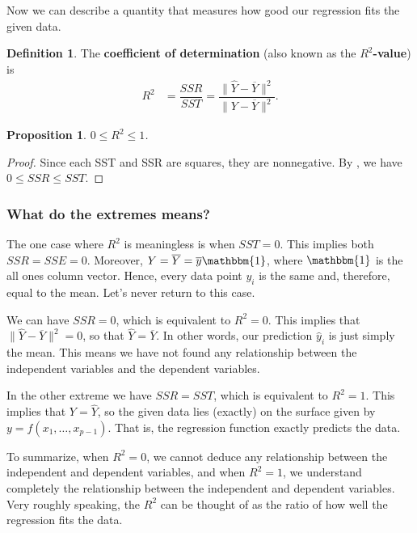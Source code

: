 \documentclass[a4paper, 12pt]{article}
\numberwithin{equation}{section}
\numberwithin{figure}{section}
\newtheorem{prop}[thm]{Proposition}
\theoremstyle{definition}
\newtheorem{defn}[thm]{Definition}
\renewcommand{\leq}{\leqslant}
\begin{document}
Now we can describe a quantity that measures how good our regression fits the
given data. 

\begin{defn}
	The \textbf{coefficient of determination} (also known as the
	\textbf{$R^2$-value}) is 
	\begin{align*} 
		R^2 &= \dfrac{SSR}{SST} = \dfrac{\|\widehat{Y} - \overline{Y}\|^2}{\| Y - \overline{Y}\|^2} .
	\end{align*} 
\end{defn}

\begin{prop}
	$0\leq R^2 \leq 1$.
\end{prop}

\begin{proof}
	Since each SST and SSR are squares, they are nonnegative. By
	, we have $0\leq SSR\leq SST$.
\end{proof}

\subsubsection{What do the extremes means?}

The one case where $R^2$ is meaningless is when $SST=0$. This implies both
$SSR=SSE=0$. Moreover, $Y = \overline{Y} = \overline{y} \mathbbm{1}$, where
$\mathbbm{1}$ is the all ones column vector. Hence, every data point $y_i$ is
the same and, therefore, equal to the mean. Let's never return to this case.

We can have $SSR=0$, which is equivalent to $R^2=0$. This implies that $\|
\widehat{Y} - \overline{Y}\|^2= 0$, so that $\widehat{Y} = \overline{Y}$. In
other words, our prediction $\widehat{y}_i$ is just simply the mean. This means
we have not found any relationship between the independent variables and the
dependent variables. 

In the other extreme we have $SSR=SST$, which is equivalent to $R^2=1$. This
implies that $Y = \widehat{Y}$, so the given data lies (exactly) on the surface
given by $y=f(x_1,\dots, x_{p-1})$. That is, the regression function exactly
predicts the data. 

To summarize, when $R^2=0$, we cannot deduce any relationship between the
independent and dependent variables, and when $R^2=1$, we understand completely
the relationship between the independent and dependent variables. Very roughly
speaking, the $R^2$ can be thought of as the ratio of how well the regression
fits the data. 
\end{document}
